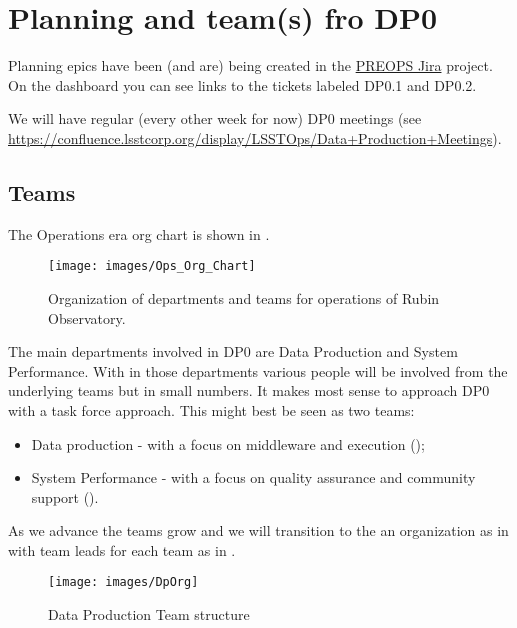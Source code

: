 \section{Planning and team(s) fro DP0} \label{sec:plan}

Planning epics have been (and are) being created in the \href{https://jira.lsstcorp.org/secure/Dashboard.jspa?selectPageId=15608}{PREOPS Jira} project.
On the dashboard you can see links to the  tickets labeled DP0.1 and DP0.2.

We will have regular (every other week for now) DP0 meetings (see \url{https://confluence.lsstcorp.org/display/LSSTOps/Data+Production+Meetings}).

\subsection {Teams}

The Operations era org chart is shown in .


\begin{figure}
\begin{center}
\texttt{[image: images/Ops\_Org\_Chart]}
\end{center}
\caption{ Organization of departments and teams  for operations of Rubin Observatory. \label{fig:org}}
\end{figure}

The main departments involved in DP0 are Data Production and System Performance. With in those departments various people will be involved from the underlying teams but in small numbers. It makes most sense to approach DP0 with a task force approach. This might best be seen as two teams:

\begin{itemize}
\item Data production - with a focus on middleware and execution ();
\item System Performance - with a focus on quality assurance and community support ().
\end{itemize}

As we advance the teams grow and we will transition to the an organization as in 
with team leads for each team as in .


\begin{figure}
\begin{center}
\texttt{[image: images/DpOrg]}
\end{center}
\caption{Data Production Team structure \label{fig:dporg}}
\end{figure}


